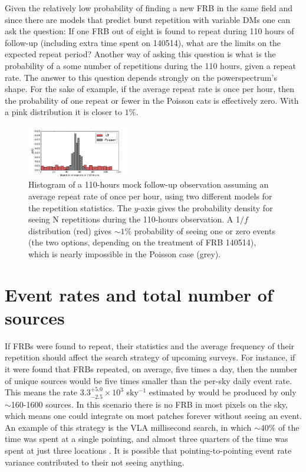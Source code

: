 \documentclass[useAMS,usenatbib]{mn2e}
\begin{document}
Given the relatively low probability of finding 
a new FRB in the same field and since there are models that predict
burst repetition with variable DMs \citep{2015arXiv150505535C, 2015arXiv150701002M}
one can ask the question: If one FRB out of eight is found to
repeat during 110 hours of follow-up (including extra time spent on 140514), 
what are the limits on the expected
repeat period? Another way of asking this question is what is the probability of 
a some number of repetitions during the 110 hours, given a repeat rate. The answer to 
this question depends strongly on the powerspectrum's shape. For the sake of example, if the average 
repeat rate is once per hour, then the probability of one repeat or fewer in the Poisson
cats is effectively zero. With a pink distribution it is closer to $1\%$. 


\begin{figure}
  \centering
   \includegraphics[trim={0in, 0in, 0in, 0in}, width=0.4\textwidth, height=0.23\textwidth]{110_hours_followup.png}
   \caption{Histogram of a 110-hours mock follow-up observation assuming an average repeat rate of 
   once per hour, using two different models 
   for the repetition statistics. The $y$-axis gives the probability density for seeing 
   N repetitions during the 110-hours observation.
   A 1$/f$ distribution (red) gives $\sim1\%$ probability of seeing one or zero events 
   (the two options, depending on the treatment of FRB 140514), 
   which is nearly impossible in the Poisson case (grey).}
   \label{FIG-hist}
\end{figure}


\section{Event rates and total number of sources}
\label{rate}

If FRBs were found to repeat, their statistics and the
average frequency of their repetition 
should affect the search strategy of upcoming surveys. 
For instance, if it were found that FRBs repeated,
on average, five times a day, then the number of unique 
sources would be five times smaller than the per-sky 
daily event rate. This means the rate 
$3.3^{+5.0}_{-2.5}\times10^3$ sky$^{-1}$ estimated by 
\cite{2015arXiv150500834R} would be produced by
only $\sim$160-1600 sources. In this scenario 
there is no FRB in most pixels on the sky, which means
one could integrate on most patches forever without 
seeing an event. An example of this strategy is the VLA millisecond search, 
in which $\sim40\%$ of the time was spent at a single pointing, and
almost three quarters of the time was spent at just three locations \citep{2015ApJ...807...16L}.
It is possible that pointing-to-pointing event rate variance contributed 
to their not seeing anything.
\end{document}
